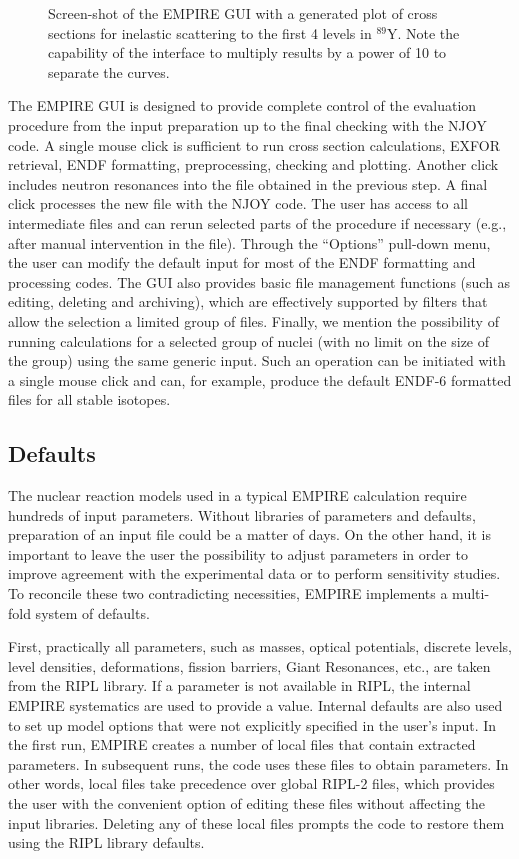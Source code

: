 \begin{figure*}[htbp]
\caption{Screen-shot of the EMPIRE GUI with a generated plot of cross
sections for inelastic scattering to the first 4 levels in $^{89}$Y.
Note the capability of the interface to multiply results by a power of 10 to
separate the curves.}
\label{fig:screenshot}
\end{figure*}

The EMPIRE GUI is designed to provide complete control of the evaluation
procedure from the input preparation up to the final checking with the NJOY
code. A single mouse click is sufficient to run cross section calculations,
EXFOR retrieval, ENDF formatting, preprocessing, checking and plotting.
Another click includes neutron resonances into the file obtained in the
previous step. A final click processes the new file with the NJOY
code. The user
has access to all intermediate files and can rerun selected parts of the
procedure if necessary (e.g., after manual intervention in the file).
Through the ``Options'' pull-down menu, the user can modify the
default input for
most of the ENDF formatting and processing codes. The GUI also provides basic
file management functions (such as editing, deleting and archiving), which
are effectively supported by filters that allow the selection a
limited group of
files. Finally, we mention the possibility of running calculations for a
selected group of nuclei (with no limit on the size of
the group) using the same
generic input. Such an operation can be initiated with a
single mouse click and can, for example, produce the default
ENDF-6 formatted files for all stable isotopes.

\subsection{Defaults}

The nuclear reaction models used in a typical EMPIRE calculation require
hundreds of input parameters. Without libraries of parameters and defaults,
preparation of an input file could be a matter of days.
On the other hand, it is
important to leave the user the possibility to adjust parameters in
order to improve agreement with the experimental data or to perform sensitivity
studies. To reconcile these two contradicting necessities, EMPIRE implements
a multi-fold system of defaults.

First, practically all parameters, such as masses, optical potentials,
discrete levels, level densities, deformations, fission barriers, Giant
Resonances, etc., are taken from the RIPL library. If a parameter is not
available in RIPL, the internal EMPIRE systematics are used to provide a
value. Internal defaults are also used to set up model options that were not
explicitly specified in the user's input. In the first run, EMPIRE creates a
number of local files that contain extracted parameters. In subsequent runs,
the code uses these files to obtain parameters. In other words, local files
take precedence over global RIPL-2 files, which provides the user with the
convenient option of editing these files without affecting the input libraries.
Deleting any of these local files prompts the code to restore them using the
RIPL library defaults.

